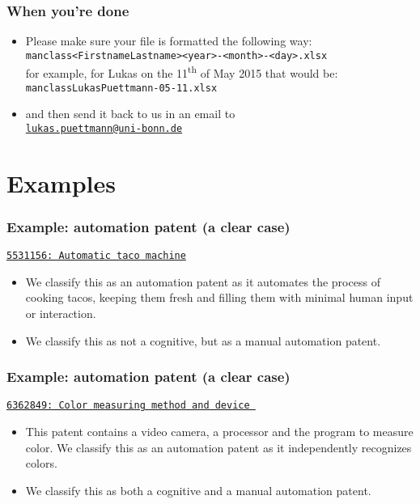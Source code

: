\documentclass[10pt]{beamer}
\begin{document}
\begin{frame}\frametitle{When you're done}
	\begin{itemize}	
		\item Please make sure your file is formatted the following way:\\[0.1cm]
\texttt{manclass\textunderscore <FirstnameLastname>\textunderscore <year>-<month>-<day>.xlsx}\\[0.3cm]
		for example, for Lukas on the 11\textsuperscript{th} of May 2015 that would be:\\[0.1cm]
\texttt{manclass\textunderscore LukasPuettmann-05-11.xlsx}\\[0.3cm]
		\item and then send it back to us in an email to\\[0.1cm] \hspace{1cm}\href{mailto:lukas.puettmann@uni-bonn.de}{\texttt{lukas.puettmann@uni-bonn.de}}\\[0.1cm]
	\end{itemize}
\end{frame}



\section{Examples}
\setcounter{subsection}{1} %


\begin{frame}\frametitle{Example: automation patent (a clear case)}
\href{https://www.google.de/patents/US5531156}{\texttt{5531156: Automatic taco machine}}
	\begin{itemize}	
	\item We classify this as an automation patent as it automates the process of cooking tacos, keeping them fresh and filling them with minimal human input or interaction. 
	\item We classify this as not a cognitive, but as a manual automation patent.
	\end{itemize}
\end{frame}


\begin{frame}\frametitle{Example: automation patent (a clear case)}
\href{https://www.google.de/patents/US6362849}{\texttt{6362849: Color measuring method and device }}
	\begin{itemize}	
	\item This patent contains a video camera, a processor and the program to measure color. We classify this as an automation patent as it independently recognizes colors.
	\item We classify this as both a cognitive and a manual automation patent.
	\end{itemize}
\end{frame}
\end{document}
